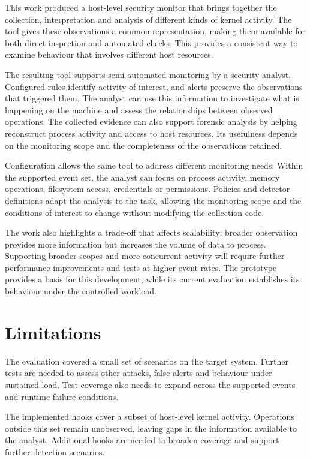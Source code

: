 This work produced a host-level security monitor that brings together
the collection, interpretation and analysis of different kinds of kernel
activity. The tool gives these observations a common representation,
making them available for both direct inspection and automated checks.
This provides a consistent way to examine behaviour that involves
different host resources.

The resulting tool supports semi-automated monitoring by a security
analyst. Configured rules identify activity of interest, and alerts
preserve the observations that triggered them. The analyst can use this
information to investigate what is happening on the machine and assess
the relationships between observed operations. The collected evidence
can also support forensic analysis by helping reconstruct process
activity and access to host resources. Its usefulness depends on the
monitoring scope and the completeness of the observations retained.

Configuration allows the same tool to address different monitoring needs.
Within the supported event set, the analyst can focus on process activity,
memory operations, filesystem access, credentials or permissions.
Policies and detector definitions adapt the analysis to the task,
allowing the monitoring scope and the conditions of interest to change
without modifying the collection code.

The work also highlights a trade-off that affects scalability: broader
observation provides more information but increases the volume of data
to process. Supporting broader scopes and more
concurrent activity will require further performance improvements and
tests at higher event rates. The prototype provides a basis for this
development, while its current evaluation establishes its behaviour
under the controlled workload.

\section{Limitations}
\label{sec:conclusions-limitations}

The evaluation covered a small set of scenarios on the target system.
Further tests are needed to assess other attacks, false alerts and
behaviour under sustained load. Test coverage also needs to expand
across the supported events and runtime failure conditions.

The implemented hooks cover a subset of host-level kernel activity.
Operations outside this set remain unobserved, leaving gaps in the
information available to the analyst. Additional hooks are needed
to broaden coverage and support further detection scenarios.

